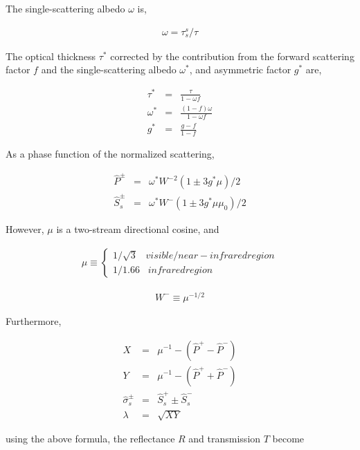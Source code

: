 The single-scattering albedo \(\omega\) is,

\begin{eqnarray}
  \omega = \tau_s^s/\tau
\end{eqnarray}

The optical thickness \(\tau^*\) corrected by the contribution from the forward scattering factor \(f\) 
and the single-scattering albedo \(\omega^*\), and asymmetric factor \(g^*\) are,

\begin{eqnarray}
  \tau^* & = & \frac{\tau}{1-\omega f} \\
  \omega^* & = & \frac{(1-f)\omega}{1-\omega f}   \\
  g^* & = & \frac{g-f}{1-f}  
\end{eqnarray}

As a phase function of the normalized scattering,

\begin{eqnarray}
  \hat{P}^\pm   & = & \omega^* {W^-}^2 \left( 1 \pm 3g^* \mu \right)/2 \\
  \hat{S}_s^\pm & = & \omega^* W^-     \left( 1 \pm 3g^* \mu \mu_0 \right)/2
\end{eqnarray}

However, \(\mu\) is a two-stream directional cosine, and

\begin{eqnarray}
  \mu \equiv \left\{ \begin{array}{ll}
                   1/\sqrt{3} \; \; \;  visible/near-infrared region \\
                   1/1.66     \; \; \;  infrared region
                    \end{array}
             \right.
\end{eqnarray}

\begin{eqnarray}
  W^- \equiv \mu^{-1/2}
\end{eqnarray}

Furthermore,

\begin{eqnarray}
  X & = & \mu^{-1} - (\hat{P}^+ - \hat{P}^- ) \\
  Y & = & \mu^{-1} - (\hat{P}^+ + \hat{P}^- ) \\
  \hat{\sigma}_s^{\pm} & = & \hat{S}_s^+ \pm \hat{S}_s^- \\
  \lambda & = & \sqrt{XY}
\end{eqnarray}

using the above formula, the reflectance \(R\) and transmission \(T\) become

